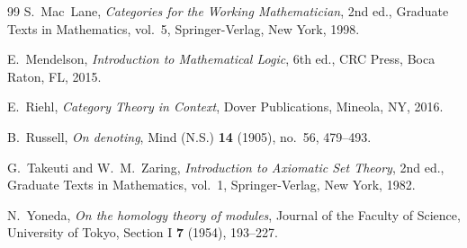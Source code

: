 \documentclass[10pt,a4paper]{article}
\begin{document}
\begin{thebibliography}{99}
S.~Mac~Lane,
\emph{Categories for the Working Mathematician}, 2nd ed.,
Graduate Texts in Mathematics, vol.~5, Springer-Verlag, New York, 1998.

E.~Mendelson,
\emph{Introduction to Mathematical Logic}, 6th ed.,
CRC Press, Boca Raton, FL, 2015.

E.~Riehl,
\emph{Category Theory in Context},
Dover Publications, Mineola, NY, 2016.

B.~Russell,
\emph{On denoting},
Mind (N.S.) \textbf{14} (1905), no.~56, 479--493.

G.~Takeuti and W.~M.~Zaring,
\emph{Introduction to Axiomatic Set Theory}, 2nd ed.,
Graduate Texts in Mathematics, vol.~1, Springer-Verlag, New York, 1982.

N.~Yoneda,
\emph{On the homology theory of modules},
Journal of the Faculty of Science, University of Tokyo, Section I \textbf{7} (1954), 193--227.

\end{thebibliography}
\end{document}
